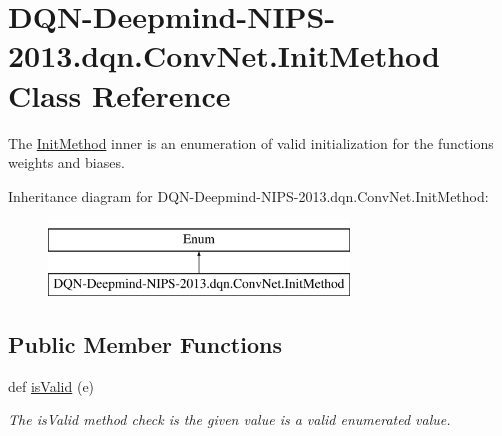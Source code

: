 \hypertarget{classDQN-Deepmind-NIPS-2013_1_1dqn_1_1ConvNet_1_1InitMethod}{}\section{D\+Q\+N-\/\+Deepmind-\/\+N\+I\+P\+S-\/2013.dqn.\+Conv\+Net.\+Init\+Method Class Reference}
\label{classDQN-Deepmind-NIPS-2013_1_1dqn_1_1ConvNet_1_1InitMethod}


The \hyperlink{classDQN-Deepmind-NIPS-2013_1_1dqn_1_1ConvNet_1_1InitMethod}{Init\+Method} inner is an enumeration of valid initialization for the functions \textquotesingle{}weights\textquotesingle{} and \textquotesingle{}biases\textquotesingle{}.  


Inheritance diagram for D\+Q\+N-\/\+Deepmind-\/\+N\+I\+P\+S-\/2013.dqn.\+Conv\+Net.\+Init\+Method\+:\begin{figure}[H]
\begin{center}
\leavevmode
\includegraphics[height=2.000000cm]{classDQN-Deepmind-NIPS-2013_1_1dqn_1_1ConvNet_1_1InitMethod}
\end{center}
\end{figure}
\subsection*{Public Member Functions}
\begin{DoxyCompactItemize}
\item 
def \hyperlink{classDQN-Deepmind-NIPS-2013_1_1dqn_1_1ConvNet_1_1InitMethod_ae6c011ae724bdf51a3dc37c739170612}{is\+Valid} (e)
\begin{DoxyCompactList}\small\item\em The is\+Valid method check is the given value is a valid enumerated value. \end{DoxyCompactList}\end{DoxyCompactItemize}

